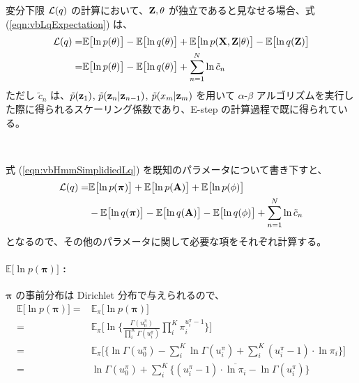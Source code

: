 変分下限 ${\cal L}(q)$ の計算において、${\bf Z}, \theta$ が独立であると見なせる場合、式 (\ref{eqn:vbLqExpectation}) は、
\begin{align}
  {\cal L}(q)  =&  \mathbb{E}\bigl[\ln p(\theta) \bigr] - \mathbb{E}\bigl[\ln q(\theta) \bigr] + \mathbb{E}\bigl[\ln p({\bf X}, {\bf Z} | \theta) \bigr] - \mathbb{E}\bigl[\ln q( {\bf Z} ) \bigr]  \label{eqn:vbHmmGenericLq}  \\
    =&  \mathbb{E}\bigl[\ln p(\theta) \bigr] - \mathbb{E}\bigl[\ln q(\theta) \bigr] + \sum_{n=1}^N \ln \tilde{c}_n  \label{eqn:vbHmmSimplidiedLq}  
\end{align}
ただし $\tilde{c}_n$ は、$\tilde{p}({\bf z}_1)$, $\tilde{p}({\bf z}_n | {\bf z}_{n-1})$, $\tilde{p}(x_m | {\bf z}_m)$ を用いて $\alpha$-$\beta$ アルゴリズムを実行した際に得られるスケーリング係数であり、E-step の計算過程で既に得られている。

\

式 (\ref{eqn:vbHmmSimplidiedLq}) を既知のパラメータについて書き下すと、
\begin{align}
  {\cal L}(q)  =&  \mathbb{E}\bigl[\ln p({\boldsymbol \pi}) \bigr] + \mathbb{E}\bigl[\ln p({\bf A}) \bigr] + \mathbb{E}\bigl[\ln p(\phi) \bigr]  \notag  \\  
    &  - \mathbb{E}\bigl[\ln q({\boldsymbol \pi}) \bigr] - \mathbb{E}\bigl[\ln q({\bf A}) \bigr] - \mathbb{E}\bigl[\ln q( \phi ) \bigr] + \sum_{n=1}^N \ln \tilde{c}_n  \label{eqn:vbHmmLq}  
\end{align}
となるので、その他のパラメータに関して必要な項をそれぞれ計算する。

\paragraph{ $\mathbb{E}\bigl[\ln p({\boldsymbol \pi}) \bigr]$ : }
${\boldsymbol \pi}$ の事前分布は Dirichlet 分布で与えられるので、
\begin{align}
  \mathbb{E}\bigl[\ln p({\boldsymbol \pi}) \bigr]  =&  \mathbb{E}_{\pi}\bigl[ \ln p({\boldsymbol \pi}) \bigr]  \\
  =&  \mathbb{E}_{\pi}\Biggl[ \ln \biggl\{ \frac{\Gamma(u_0^\pi)}{\prod_i^K \Gamma(u_i^\pi)} \prod_i^K \pi_i^{u_i^\pi - 1} \biggr\} \Biggr]  \\
  =&  \mathbb{E}_{\pi}\Biggl[ \biggl\{ \ln\Gamma(u_0^\pi) - \sum_i^K \ln\Gamma(u_i^\pi) + \sum_i^K (u_i^\pi - 1) \cdot \ln \pi_i \biggr\} \Biggr]  \\
  =&  \ln\Gamma(u_0^\pi) + \sum_i^K \biggl\{ (u_i^\pi - 1) \cdot \overline{\ln \pi_i} - \ln\Gamma(u_i^\pi)\biggr\}  \label{eqn:expLnPPi}
\end{align}

